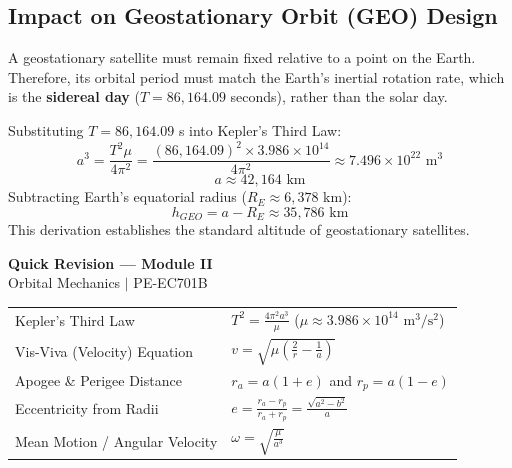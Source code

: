 \documentclass[12pt,a4paper]{article}
\renewcommand{\arraystretch}{1.45}
\begin{document}
\subsection{Impact on Geostationary Orbit (GEO) Design}
A geostationary satellite must remain fixed relative to a point on the Earth. Therefore, its orbital period must match the Earth's inertial rotation rate, which is the \textbf{sidereal day} ($T = 86,164.09$ seconds), rather than the solar day.

Substituting $T = 86,164.09$ s into Kepler's Third Law:
\begin{equation}
  a^3 = \frac{T^2 \mu}{4\pi^2} = \frac{(86,164.09)^2 \times 3.986 \times 10^{14}}{4\pi^2} \approx 7.496 \times 10^{22} \text{ m}^3
\end{equation}
\begin{equation}
  a \approx 42,164 \text{ km}
\end{equation}
Subtracting Earth's equatorial radius ($R_E \approx 6,378$ km):
\begin{equation}
  h_{GEO} = a - R_E \approx 35,786 \text{ km}
\end{equation}
This derivation establishes the standard altitude of geostationary satellites.

\newpage
\begin{center}
  {\large\bfseries\color{myred} Quick Revision --- Module II}\\[3pt]
  {\small\color{mydark} Orbital Mechanics $|$ PE-EC701B}
\end{center}
\noindent{\color{myred}\rule{\linewidth}{1.2pt}}
\vspace{4pt}

\begin{tcolorbox}[formulabox, title={\textbf{Key Formulas at a Glance}}]
\renewcommand{\arraystretch}{1.9}
\begin{tabularx}{\linewidth}{B{5.0cm} X}Kepler's Third Law & $\displaystyle T^2 = \frac{4\pi^2 a^3}{\mu}$ \quad ($\mu \approx 3.986 \times 10^{14} \text{ m}^3/\text{s}^2$) \\[4pt]
Vis-Viva (Velocity) Equation & $\displaystyle v = \sqrt{\mu\left(\frac{2}{r} - \frac{1}{a}\right)}$ \\[4pt]
Apogee \& Perigee Distance & $r_a = a(1 + e)$ \quad and \quad $r_p = a(1 - e)$ \\[4pt]
Eccentricity from Radii & $\displaystyle e = \frac{r_a - r_p}{r_a + r_p} = \frac{\sqrt{a^2 - b^2}}{a}$ \\[4pt]
Mean Motion / Angular Velocity & $\displaystyle \omega = \sqrt{\frac{\mu}{a^3}}$
\end{tabularx}
\end{tcolorbox}
\end{document}
